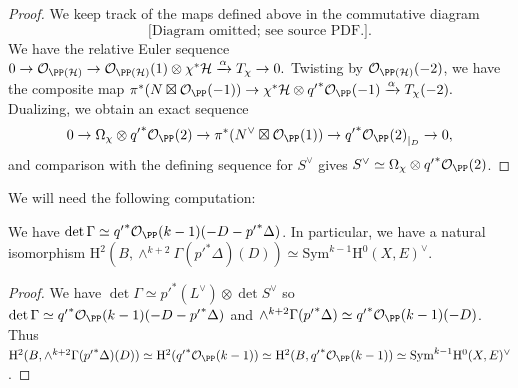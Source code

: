 \begin{proof}
We keep track of the maps defined above in the commutative diagram
{\small{$$\text{[Diagram omitted; see source PDF.]}.$$}}
We have the relative Euler sequence $0 \to \mathcal{O}_{\PP(\mathcal{H})} \to \mathcal{O}_{\PP(\mathcal{H})}(1) \otimes \chi^* \mathcal{H} \xrightarrow{\alpha} T_{\chi} \to 0.$
Twisting by $\mathcal{O}_{\PP(\mathcal{H})}(-2)$, we have the composite map
$\pi^*(N \boxtimes \mathcal{O}_{\PP}(-1)) \to \chi^*\mathcal{H} \otimes {q'}^*\mathcal{O}_{\PP}(-1)\xrightarrow{\alpha} T_{\chi}(-2).$
Dualizing, we obtain an exact sequence
$$0 \to \Omega_{\chi}\otimes {q'}^*\mathcal{O}_{\PP}(2) \to \pi^*(N^{\vee} \boxtimes \mathcal{O}_{\PP}(1)) \to {{q'}^*\mathcal{O}_{\PP}(2)}_{|_D} \to 0,$$
and comparison with the defining sequence for $S^{\vee}$ gives $S^{\vee} \simeq  \Omega_{\chi}\otimes {q'}^*\mathcal{O}_{\PP}(2)$.
\end{proof}

We will need the following computation:
\begin{lem}
\notready \label{det-gamma}
We have $\det \Gamma \simeq {q'}^* \mathcal{O}_{\PP}(k-1)(-D-{p'}^*\Delta)$. In particular, we have a natural isomorphism $\mathrm{H}^2(B, \wedge^{k+2} \Gamma ({p'}^*\Delta)(D))\simeq \mathrm{Sym}^{k-1}\mathrm{H}^0(X,E)^{\vee}$.
\end{lem}
\begin{proof}
We have $\det \Gamma \simeq {p'}^*(L^{\vee}) \otimes \det S^{\vee}$ so $\det \Gamma \simeq {q'}^* \mathcal{O}_{\PP}(k-1)(-D-{p'}^*\Delta)$ and $\wedge^{k+2} \Gamma ({p'}^*\Delta)\simeq {q'}^* \mathcal{O}_{\PP}(k-1)(-D)$. Thus $\mathrm{H}^2(B, \wedge^{k+2} \Gamma ({p'}^*\Delta)(D))\simeq \mathrm{H}^2({q'}^* \mathcal{O}_{\PP}(k-1))\simeq \mathrm{H}^2(B,{q'}^* \mathcal{O}_{\PP}(k-1)) \simeq \mathrm{Sym}^{k-1}\mathrm{H}^0(X,E)^{\vee}$.
\end{proof}


